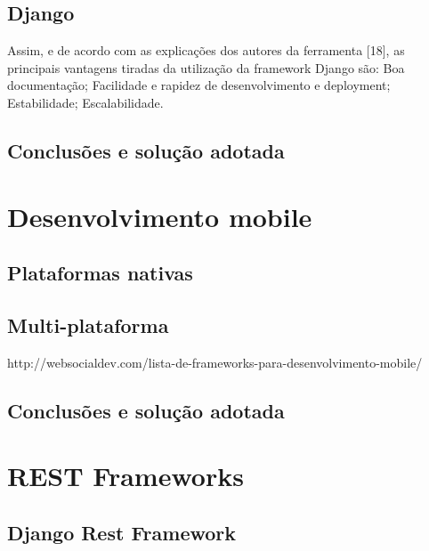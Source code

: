 \subsection{Django}


Assim, e de acordo com as explicações dos autores da ferramenta [18], as
principais vantagens tiradas da utilização da framework Django são:
Boa documentação;
Facilidade e rapidez de desenvolvimento e deployment;
Estabilidade;
Escalabilidade.


\subsection{Conclusões e solução adotada}



\newpage
\section{Desenvolvimento mobile}



\subsection{Plataformas nativas}




\subsection{Multi-plataforma}

http://websocialdev.com/lista-de-frameworks-para-desenvolvimento-mobile/


\subsection{Conclusões e solução adotada}





\newpage
\section{REST Frameworks}




\subsection{Django Rest Framework}





